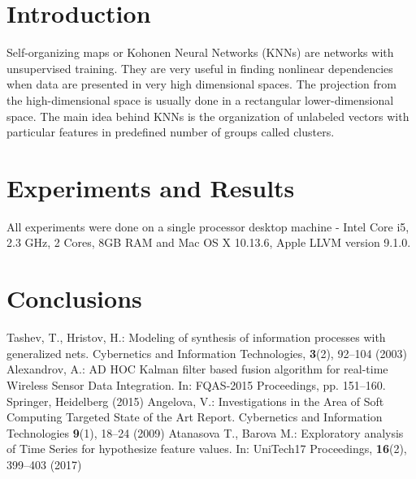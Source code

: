 \documentclass[runningheads]{llncs}
\begin{document}
\section{Introduction}

Self-organizing maps or Kohonen Neural Networks (KNNs) are networks with unsupervised training. They are very useful in finding nonlinear dependencies when data are presented in very high dimensional spaces. The projection from the high-dimensional space is usually done in a rectangular lower-dimensional space. The main idea behind KNNs is the organization of unlabeled vectors with particular features in predefined number of groups called clusters. 

\section{Experiments and Results}

All experiments were done on a single processor desktop machine - Intel Core i5, 2.3 GHz, 2 Cores, 8GB RAM and Mac OS X 10.13.6, Apple LLVM version 9.1.0.

\section{Conclusions}

\begin{thebibliography}{8}
Tashev, T., Hristov, H.: Modeling of synthesis of information processes with generalized nets. Cybernetics and Information Technologies, \textbf{3}(2), 92--104 (2003) 
Alexandrov, A.: AD HOC Kalman filter based fusion algorithm for real-time Wireless Sensor Data Integration. In: FQAS-2015 Proceedings, pp. 151--160. Springer, Heidelberg (2015)
Angelova, V.: Investigations in the Area of Soft Computing Targeted State of the Art Report. Cybernetics and Information Technologies \textbf{9}(1), 18--24 (2009)
Atanasova T., Barova M.: Exploratory analysis of Time Series for hypothesize feature values. In: UniTech17 Proceedings,  \textbf{16}(2), 399--403 (2017)
\end{thebibliography}
\end{document}
